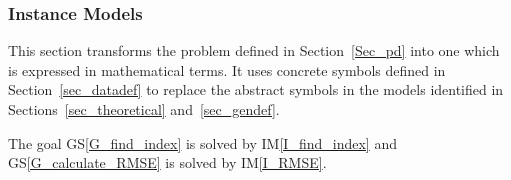 \documentclass[12pt]{article}
\newcommand{\colAwidth}{0.13\textwidth}
\newcommand{\colBwidth}{0.82\textwidth}
\newcommand{\gsref}[1]{GS\ref{#1}} \newcounter{instnum} %
\newcommand{\iref}[1]{IM\ref{#1}} \newcounter{reqnum} %
\begin{document}


\subsubsection{Instance Models} \label{sec_instance}    

This section transforms the problem defined in Section~\ref{Sec_pd} into one
which is expressed in mathematical terms. It uses concrete symbols defined in
Section~\ref{sec_datadef} to replace the abstract symbols in the models
identified in Sections~\ref{sec_theoretical} and~\ref{sec_gendef}.

The goal \gsref{G_find_index} is solved by \iref{I_find_index} and
\gsref{G_calculate_RMSE} is solved by \iref{I_RMSE}.

~\newline

\end{document}
